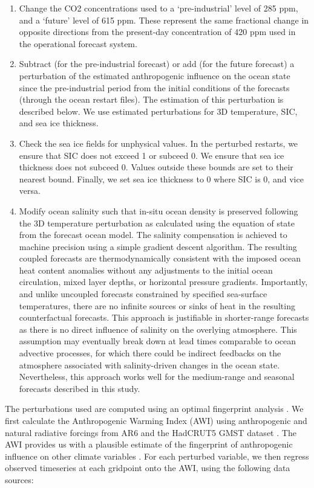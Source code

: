     \begin{enumerate}
      \item Change the CO2 concentrations used to a `pre-industrial' level of 285 ppm, and a `future' level of 615 ppm. These represent the same fractional change in opposite directions from the present-day concentration of 420 ppm used in the operational forecast system.
      \item Subtract (for the pre-industrial forecast) or add (for the future forecast) a perturbation of the estimated anthropogenic influence on the ocean state since the pre-industrial period from the initial conditions of the forecasts (through the ocean restart files). The estimation of this perturbation is described below. We use estimated perturbations for 3D temperature, SIC, and sea ice thickness.
      \item Check the sea ice fields for unphysical values. In the perturbed restarts, we ensure that SIC does not exceed 1 or subceed 0. We ensure that sea ice thickness does not subceed 0. Values outside these bounds are set to their nearest bound. Finally, we set sea ice thickness to 0 where SIC is 0, and vice versa.
      \item Modify ocean salinity such that in-situ ocean density is preserved following the 3D temperature perturbation as calculated using the equation of state from the forecast ocean model. The salinity compensation is achieved to machine precision using a simple gradient descent algorithm. The resulting coupled forecasts are thermodynamically consistent with the imposed ocean heat content anomalies without any adjustments to the initial ocean circulation, mixed layer depths, or horizontal pressure gradients. Importantly, and unlike uncoupled forecasts constrained by specified sea-surface temperatures, there are no infinite sources or sinks of heat in the resulting counterfactual forecasts. This approach is justifiable in shorter-range forecasts as there is no direct influence of salinity on the overlying atmosphere. This assumption may eventually break down at lead times comparable to ocean advective processes, for which there could be indirect feedbacks on the atmosphere associated with salinity-driven changes in the ocean state. Nevertheless, this approach works well for the medium-range and seasonal forecasts described in this study.
    \end{enumerate}
  
    The perturbations used are computed using an optimal fingerprint analysis \cite{hasselmann_optimal_1993,hasselmann_multi-pattern_1997,haustein_real-time_2017}. We first calculate the Anthropogenic Warming Index (AWI) using anthropogenic and natural radiative forcings from AR6 \cite{masson-delmotte_earths_2021} and the HadCRUT5 GMST dataset \cite{morice_updated_2021}. The AWI provides us with a plausible estimate of the fingerprint of anthropogenic influence on other climate variables \cite{hasselmann_optimal_1993}. For each perturbed variable, we then regress observed timeseries at each gridpoint onto the AWI, using the following data sources:
  
